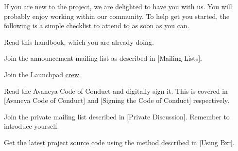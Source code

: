 

If you are new to the project, we are delighted to have you with us. You will probably enjoy working within our  community. To help get you started, the following is a simple checklist to attend to as soon as you can.

\usesymbols[mvs]
\startitemize[1]
\item
Read this handbook, which you are already doing.

\item
Join the announcement mailing list as described in [Mailing Lists].

\item
Join the Launchpad \href{https://launchpad.net/~avaneya/+join}{crew}.

\item
Read the Avaneya Code of Conduct and digitally sign it. This is covered in [Avaneya Code of Conduct] and [Signing the Code of Conduct] respectively.

\item
Join the private mailing list described in [Private Discussion]. Remember to introduce yourself.

\item
Get the latest project source code using the method described in [Using Bzr].
\stopitemize

